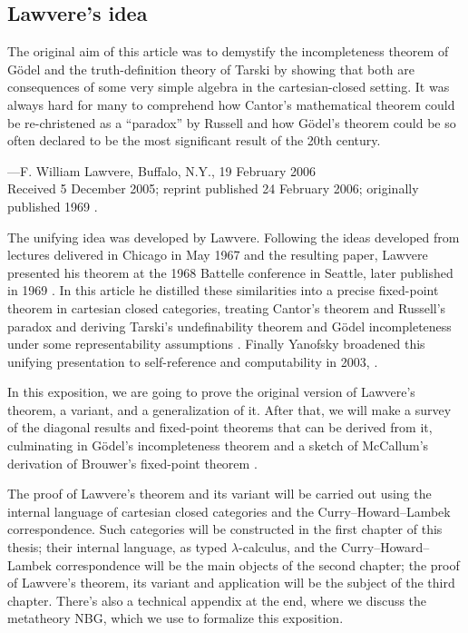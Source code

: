 \subsection*{Lawvere's idea}

\begin{displayquote}
The original aim of this article \parencite{Lawvere1969} was to demystify the incompleteness theorem of Gödel and the truth-definition theory of Tarski by showing that both are consequences of some
very simple algebra in the cartesian-closed setting. It was always hard for many to comprehend how Cantor's mathematical theorem could be re-christened as a \enquote{paradox} by Russell and how Gödel's theorem could be so often declared to be the most significant
result of the 20th century.
\end{displayquote}

\begin{flushright}
---F. William Lawvere, Buffalo, N.Y., 19 February 2006\\
{\small Received 5 December 2005; reprint published 24 February 2006; originally published 1969 \parencite[Author Commentary, pp.~1--2]{Lawvere2006}.}
\end{flushright}

The unifying idea was developed by Lawvere. Following the ideas developed from lectures delivered in Chicago in May 1967 and the resulting paper, Lawvere presented his theorem at the 1968 Battelle conference in Seattle, later published in 1969 \parencite[Author Commentary, p.~1]{Lawvere2006}.
In this article he distilled these similarities into a precise fixed-point theorem in cartesian closed categories, treating Cantor's theorem and Russell's paradox and deriving
Tarski's undefinability theorem and Gödel incompleteness under some representability assumptions \parencite[\S\S~1--3]{Lawvere1969}.
Finally Yanofsky broadened this unifying presentation to self-reference and computability in 2003, \parencite{Yanofsky2003}.

In this exposition, we are going to prove the original version of Lawvere's theorem, a variant, and a generalization of it. After that, we will make a survey of the diagonal results and fixed-point theorems that can be derived from it,
culminating in Gödel's incompleteness theorem and a sketch of McCallum's derivation of Brouwer's fixed-point theorem \parencite{McCallum2020}.

The proof of Lawvere's theorem and its variant will be carried out using the internal language of cartesian closed categories and the Curry--Howard--Lambek correspondence.
Such categories will be constructed in the first chapter of this thesis; their internal language, as typed $\lambda$-calculus, and the Curry--Howard--Lambek correspondence will be
the main objects of the second chapter; the proof of Lawvere's theorem, its variant and application will be the subject of the third chapter.
There's also a technical appendix at the end, where we discuss the metatheory \textsf{NBG}, which we use to formalize this exposition.


